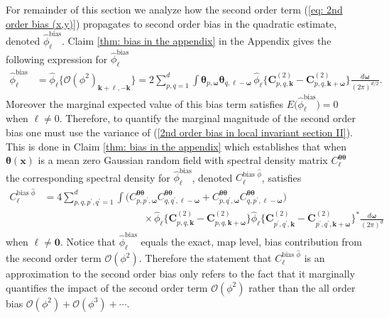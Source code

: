 \documentclass[10pt,noinfoline]{imsart}
\newcommand{\bs}{\boldsymbol}
\begin{document}
For remainder of this section we analyze how the second order term (\ref{eq: 2nd order bias (x,y)}) propagates to second order bias in the quadratic estimate, denoted $\hat\phi_{\bs \ell}^{\text{bias}}$. 
Claim \ref{thm: bias in the appendix} in the Appendix gives the following expression for $\hat\phi_{\bs \ell}^{\text{bias}}$
\begin{align}
    \label{2nd order bias in local invariant section II}
    \hat\phi_{\bs \ell}^{\text{bias}}&=\hat\phi_{\bs \ell}\big\{\mathcal O(\phi^2)_{\bs k+\bs \ell, -\bs k}\big\} =  2\sum_{p,q=1}^d\int  \bs\theta_{p,\bs\omega}\bs\theta_{q,\bs \ell - \bs\omega}\, \hat\phi_{\bs \ell}\big\{{\bs C^{(2)}_{p,q,\bs k}}- {\bs C^{(2)}_{p,q,\bs k + \bs\omega}}\big\}\frac{d\bs\omega}{(2\pi)^{d/2}}.
\end{align}
Moreover the marginal expected value of this bias term satisfies $E\big( \hat\phi_{\bs \ell}^{\text{bias}} \big) = 0$
when $\bs \ell \neq 0$. Therefore, to quantify the marginal magnitude of the second order bias one must use the variance of (\ref{2nd order bias in local invariant section II}). This is done in  Claim \ref{thm: bias in the appendix} which establishes that when $\bs\theta(\bs x)$ is a mean zero Gaussian random field with spectral density matrix $C_{\bs \ell}^{\bs \theta\bs\theta}$ the corresponding spectral density for $\hat\phi_{\bs \ell}^{\text{bias}}$, denoted $C_{\bs \ell}^{\text{bias }\hat\phi}$, satisfies
\begin{align}
	C_{\bs \ell}^{\text{bias }\hat\phi}
	&= 4\!\! \sum_{p,q,p^\prime\!,q^\prime\!=1}^d \int 
	\Big(
	C^{\bs \theta\bs \theta}_{p,p^\prime,\bs \omega}C^{\bs \theta\bs \theta}_{q,q^\prime,\bs \ell - \bs \omega}
	+ C^{\bs \theta\bs \theta}_{p,q^\prime,\bs \omega}C^{\bs \theta\bs \theta}_{q,p^\prime,\bs \ell - \bs \omega}
	\Big)\nonumber
	\\
	&\qquad\qquad\qquad\qquad\qquad\times
	\hat\phi_{\bs \ell}\big\{{\bs C^{(2)}_{p,q,\bs k}}- {\bs C^{(2)}_{p,q,\bs k + \bs\omega}}\big\}
	\hat\phi_{\bs \ell}\big\{{\bs C^{(2)}_{p^\prime,q^\prime,\bs k}}- {\bs C^{(2)}_{p^\prime,q^\prime,\bs k + \bs\omega}}\big\}^*\frac{d\bs\omega}{(2\pi)^{d}}
	\label{eq in intro on spec den of O(phi2)}
\end{align}
when $\bs \ell \neq \bs 0$.
Notice that $\hat\phi_{\bs \ell}^{\text{bias}}$ equals the exact, map level, bias contribution from the second order term $\mathcal O(\phi^2)$. Therefore the statement that $C_{\bs \ell}^{\text{bias }\hat\phi}$ is an approximation  to the second order bias only refers to the fact that it marginally quantifies the impact of the second order term $\mathcal O(\phi^2)$ rather than the all order bias $\mathcal O(\phi^2) + \mathcal O(\phi^3) + \cdots$. 
\end{document}

